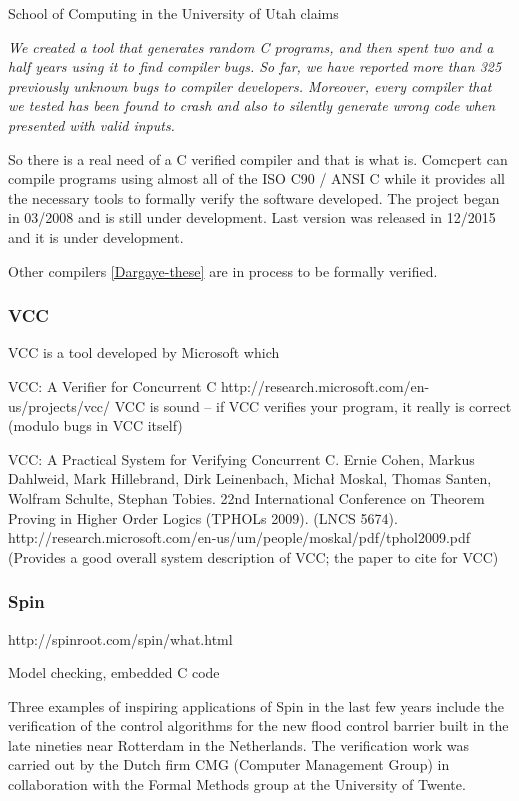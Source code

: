 School of Computing in the University of Utah claims \cite{CCompilerMotivation}

\textit{We created a tool that generates random C programs, and then spent two and a half years using it to find compiler bugs. So far, we have reported more than 325 previously unknown bugs to compiler developers. Moreover, every compiler that we tested has been found to crash and also to silently generate wrong code when presented with valid inputs.}

So there is a real need of a C verified compiler and that is what  is. 
%
Comcpert can compile programs using almost all of the ISO C90 / ANSI C while it provides all the necessary tools to formally verify the software developed.
%
The project began in 03/2008 and is still under development. Last version was released in 12/2015 and it is under development.

Other compilers \ref{Dargaye-these} are in process to be formally verified.


\subsubsection{VCC}

\gls{VCC} is a tool developed by Microsoft which

VCC: A Verifier for Concurrent C  http://research.microsoft.com/en-us/projects/vcc/
VCC is sound -- if VCC verifies your program, it really is correct (modulo bugs in VCC itself)

VCC: A Practical System for Verifying Concurrent C. Ernie Cohen, Markus Dahlweid, Mark Hillebrand, Dirk Leinenbach, Michał Moskal, Thomas Santen, Wolfram Schulte, Stephan Tobies. 22nd International Conference on Theorem Proving in Higher Order Logics (TPHOLs 2009). (LNCS 5674). http://research.microsoft.com/en-us/um/people/moskal/pdf/tphol2009.pdf (Provides a good overall system description of VCC; the paper to cite for VCC)


\subsubsection{Spin}

http://spinroot.com/spin/what.html

Model checking, embedded C code

Three examples of inspiring applications of Spin in the last few years include the verification of the control algorithms for the new flood control barrier built in the late nineties near Rotterdam in the Netherlands. The verification work was carried out by the Dutch firm CMG (Computer Management Group) in collaboration with the Formal Methods group at the University of Twente.


